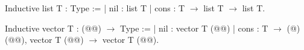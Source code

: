 Inductive list T : Type :=
| nil : list T
| cons : T $\rightarrow$
    list T $\rightarrow$
    list T.

Inductive vector T : (@@) $\rightarrow$ Type :=
| nil : vector T (@@)
| cons : T $\rightarrow$ (@\ltacforall@) (@@),
    vector T (@@) $\rightarrow$
    vector T (@@).
